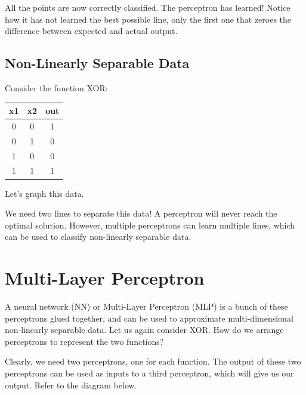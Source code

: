 \documentclass{article}
\begin{document}
All the points are now correctly classified. The perceptron has learned! Notice how it has not learned the best possible line, only the first one that zeroes the difference between expected and actual output.
\subsection{Non-Linearly Separable Data}
Consider the function XOR:

\begin{center}
\begin{tabular}{ |c|c|c| } 
 \hline
 x1 & x2 & out \\
 \hline
 0 & 0 & 1 \\ 
 0 & 1 & 0 \\ 
 1 & 0 & 0 \\ 
 1 & 1 & 1 \\ 
 \hline
\end{tabular}
\end{center}
Let's graph this data.
\begin{center}
\end{center}

We need two lines to separate this data! A perceptron will never reach the optimal solution. However, multiple perceptrons can learn multiple lines, which can be used to classify non-linearly separable data.

\section{Multi-Layer Perceptron}
A neural network (NN) or Multi-Layer Perceptron (MLP) is a bunch of these perceptrons glued together, and can be used to approximate multi-dimensional non-linearly separable data.
Let us again consider XOR. How do we arrange perceptrons to represent the two functions?

Clearly, we need two perceptrons, one for each function. The output of these two perceptrons can be used as inputs to a third perceptron, which will give us our output. Refer to the diagram below.
\end{document}
